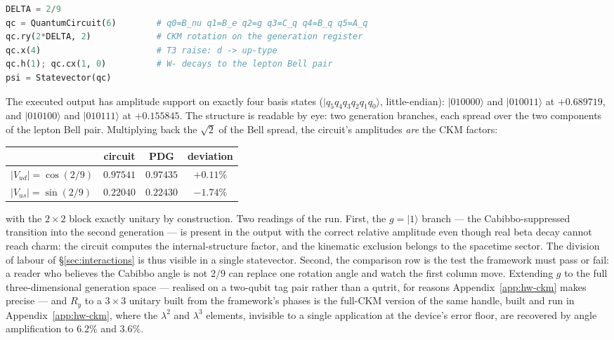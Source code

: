\begin{lstlisting}[language=Python,basicstyle=\small\ttfamily]
DELTA = 2/9
qc = QuantumCircuit(6)        # q0=B_nu q1=B_e q2=g q3=C_q q4=B_q q5=A_q
qc.ry(2*DELTA, 2)             # CKM rotation on the generation register
qc.x(4)                       # T3 raise: d -> up-type
qc.h(1); qc.cx(1, 0)          # W- decays to the lepton Bell pair
psi = Statevector(qc)
\end{lstlisting}

The executed output has amplitude support on exactly four basis states
($\lvert q_5 q_4 q_3 q_2 q_1 q_0\rangle$, little-endian): $\lvert010000\rangle$ and
$\lvert010011\rangle$ at $+0.689719$, and $\lvert010100\rangle$ and $\lvert010111\rangle$ at
$+0.155845$. The structure is readable by eye: two generation branches, each spread over the two
components of the lepton Bell pair. Multiplying back the $\sqrt2$ of the Bell spread, the circuit's
amplitudes \emph{are} the CKM factors:
\begin{center}
\begin{tabular}{lccc}
\hline
 & circuit & PDG & deviation \\
\hline
$\lvert V_{ud}\rvert = \cos(2/9)$ & $0.97541$ & $0.97435$ & $+0.11\%$ \\
$\lvert V_{us}\rvert = \sin(2/9)$ & $0.22040$ & $0.22430$ & $-1.74\%$ \\
\hline
\end{tabular}
\end{center}
with the $2\times2$ block exactly unitary by construction. Two readings of the run. First, the
$g = \lvert1\rangle$ branch --- the Cabibbo-suppressed transition into the second generation --- is
present in the output with the correct relative amplitude even though real beta decay cannot reach
charm: the circuit computes the internal-structure factor, and the kinematic exclusion belongs to
the spacetime sector. The division of labour of \S\ref{sec:interactions} is thus visible in a single
statevector. Second, the comparison row is the test the framework must pass or fail: a reader who
believes the Cabibbo angle is not $2/9$ can replace one rotation angle and watch the first column
move. Extending $g$ to the full three-dimensional generation space --- realised on a two-qubit tag
pair rather than a qutrit, for reasons Appendix~\ref{app:hw-ckm} makes precise --- and $R_y$ to a
$3\times3$ unitary built from the framework's phases is the full-CKM version of the same handle,
built and run in Appendix~\ref{app:hw-ckm}, where the $\lambda^{2}$ and $\lambda^{3}$ elements,
invisible to a single application at the device's error floor, are recovered by angle
amplification to $6.2\%$ and $3.6\%$.

